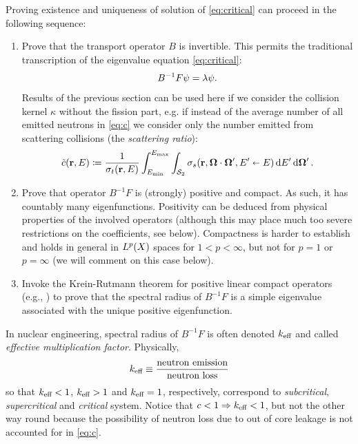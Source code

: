 Proving existence and uniqueness of solution of \eqref{eq:critical} can proceed in the following sequence:
\begin{enumerate}
	\item
		Prove that the transport operator $B$ is invertible. This permits the traditional transcription of the  eigenvalue
		equation \eqref{eq:critical}:
		$$
		B^{-1}F\psi = \lambda\psi.
		$$
		Results of the previous section can be used here if we consider the collision kernel $\kappa$ without the fission
		part, e.g. if instead of the average number of all emitted neutrons in \eqref{eq:c} we consider only the number
		emitted from scattering collisions (the \textit{scattering ratio}):
		\begin{equation}\label{eq:tildec}
		\tilde c(\mathbf{r},E) \coloneqq \frac{1}{\sigma_t(\mathbf{r},E)}\int_{E_{\text{min}}}^{E_{\text{max}}}\int_{\mathcal{S}_2}
		\sigma_s(\mathbf{r},\mathbf{\Omega}\cdot\mathbf{\Omega}', E'\shortleftarrow E)\,\text{d}E'\,\text{d}\mathbf{\Omega}'\,.
	    \end{equation}
	\item
		Prove that operator $B^{-1}F$ is (strongly) positive and compact. As such, it has countably many eigenfunctions. 
		Positivity can be deduced from physical properties of the involved operators (although this may place much too severe
		restrictions on the coefficients, see below). Compactness is harder to establish and holds in general in $L^{p}(X)$
		spaces for $1 < p < \infty$, but not for $p = 1$ or $p = \infty$ (we will comment on this case below).
	\item
		Invoke the Krein-Rutmann theorem for positive linear compact operators (e.g., \cite[Thm. 5.4.33]{DrabekNFA}) to prove
		that the spectral radius of $B^{-1}F$ is a simple eigenvalue associated with the unique positive eigenfunction.
\end{enumerate}
\begin{remark}\label{rem:keff}
In nuclear engineering, spectral radius of $B^{-1}F$ is often denoted $k_{\text{eff}}$
and called \textit{effective multiplication factor}. Physically,
$$
k_{\text{eff}} \equiv \frac{\mbox{neutron emission}}{\mbox{neutron loss}}
$$
so that 
$k_{\text{eff}} < 1$, $k_{\text{eff}} > 1$ and $k_{\text{eff}} = 1$, respectively, correspond to \textit{subcritical},
\textit{supercritical} and \textit{critical} system. Notice that $c < 1 \Rightarrow k_{\text{eff}} < 1$, but not the other way
round because the possibility of neutron loss due to out of core leakage is not accounted for in \eqref{eq:c}. 
\end{remark}

